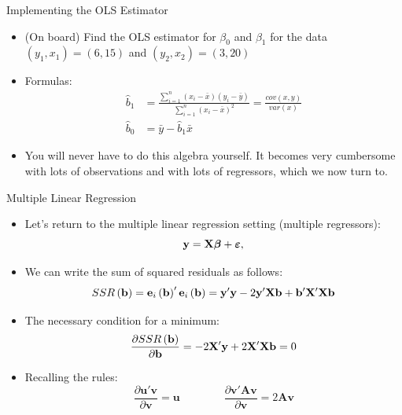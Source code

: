\documentclass[english,xcolor={dvipsnames},aspectratio=169]{beamer}
\begin{document}
\begin{frame}{Implementing the OLS Estimator}
\begin{itemize}
\item (On board) Find the OLS estimator for $\beta_0$ and $\beta_1$ for the data $(y_1,x_1)=(6,15)$ and $(y_2,x_2)=(3,20)$
\medskip

\item Formulas:
\begin{align*}
\hat{b}_1 &=\frac{\sum\limits_{i=1}^n(x_i-\bar{x})(y_i-\bar{y})}{\sum\limits_{i=1}^n(x_i-\bar{x})^2}=\frac{cov\left(x,y\right)}{var\left(x\right)} \\
\hat{b}_0 & = \bar{y} - \hat{b}_1 \bar{x}
\end{align*}

\item You will never have to do this algebra yourself. It becomes very cumbersome with lots of observations and with lots of regressors,
which we now turn to.

\end{itemize}
\end{frame}


\begin{frame}{Multiple Linear Regression}
\begin{itemize}
	\item Let's return to the multiple linear regression setting (multiple regressors):
	\begin{equation*}
		{\bf y}= {\bf X} \boldsymbol{\beta} + \boldsymbol{\varepsilon},
	\end{equation*}

	\item We can write the sum of squared residuals as follows:\[
	SSR\left({\bf b}\right) = {\bf e}_i \left({\bf b}\right) '  {\bf e}_i \left({\bf b}\right) = {\bf y}'{\bf y} - 2{\bf y}'{\bf X}{\bf b} + {\bf b}' {\bf X}'{\bf X}{\bf b} 
\]


	\item The necessary condition for a minimum:\[
	\frac{\partial SSR\left({\bf b}\right)}{\partial {\bf b}} = - 2 {\bf X}' {\bf y} + 2 {\bf X}'{\bf X} {\bf b} = 0 
	\]

	\item Recalling the rules:\[
\frac{\partial\boldsymbol{u}'\boldsymbol{v}}{\partial\boldsymbol{v}}=\boldsymbol{u}\qquad\qquad\frac{\partial\boldsymbol{v}'\boldsymbol{A}\boldsymbol{v}}{\partial\boldsymbol{v}}=2\boldsymbol{A}\boldsymbol{v}
\]

\end{itemize}
\end{frame}
\end{document}
